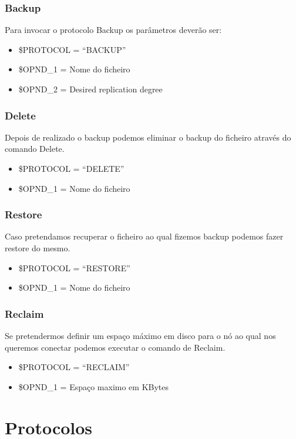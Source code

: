 \documentclass[11pt,oneside]{book}
\begin{document}
\subsubsection{Backup}
Para invocar o protocolo Backup os parâmetros deverão ser:
\begin{itemize}
    \item \$PROTOCOL = “BACKUP”
    \item \$OPND\_1 = Nome do ficheiro
    \item \$OPND\_2 = Desired replication degree
\end{itemize}

\subsubsection{Delete}
Depois de realizado o backup podemos eliminar o backup do ficheiro através do comando Delete.
\begin{itemize}
    \item \$PROTOCOL = “DELETE”
    \item \$OPND\_1 = Nome do ficheiro
\end{itemize}

\pagebreak

\subsubsection{Restore}
Caso pretendamos recuperar o ficheiro ao qual fizemos backup podemos fazer restore do mesmo.
\begin{itemize}
    \item \$PROTOCOL = “RESTORE”
    \item \$OPND\_1 = Nome do ficheiro
\end{itemize}

\subsubsection{Reclaim}
Se pretendermos definir um espaço máximo em disco para o nó ao qual nos queremos conectar podemos executar o comando de Reclaim.
\begin{itemize}
    \item \$PROTOCOL = “RECLAIM”
    \item \$OPND\_1 = Espaço maximo em KBytes
\end{itemize}


\pagebreak

\section{Protocolos}
\end{document}
